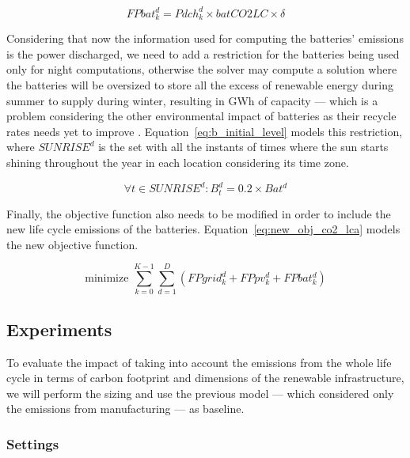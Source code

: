 \begin{equation} \label{eq:fbat_lca}
   FPbat^d_k =  Pdch^d_k \times batCO2LC \times \delta
 \end{equation}


Considering that now the information used for computing the batteries' emissions is the power discharged, we need to add a restriction for the batteries being used only for night computations, otherwise the solver may compute a solution where the batteries will be oversized to store all the excess of renewable energy during summer to supply during winter, resulting in GWh of capacity --- which is a problem considering the other environmental impact of batteries as their recycle rates needs yet to improve \cite{batteries_baumman}. Equation~\eqref{eq:b_initial_level}  models this restriction, where $SUNRISE^d$ is the set with all the instants of times where the sun starts shining throughout the year in each location considering its time zone.

\begin{equation} \label{eq:b_initial_level}
  \forall t \in SUNRISE^d :  B^d_t =  0.2 \times Bat^d
\end{equation}

Finally, the objective function also needs to be modified in order to include the new life cycle emissions of the batteries. Equation~\ref{eq:new_obj_co2_lca} models the new objective function.

\begin{equation} \label{eq:new_obj_co2_lca}
  \text{minimize }\sum_{k=0}^{K-1} \sum_{d=1}^D (FPgrid^d_k +  FPpv^d_k  + FPbat^d_k) 
\end{equation}



\subsection{Experiments}
To evaluate the impact of taking into account the emissions from the whole life cycle in terms of carbon footprint and dimensions of the renewable infrastructure, we will perform the sizing and use the previous model --- which considered only the emissions from manufacturing --- as baseline. 




\label{sec:ex_lca_pv}

\subsubsection{Settings} 

